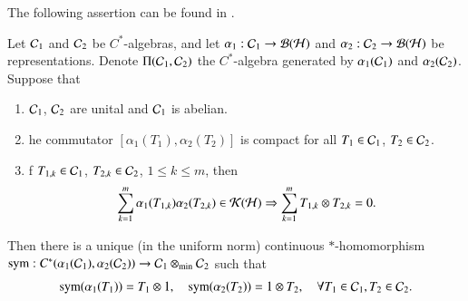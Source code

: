 \documentclass[leqno]{amsart}
\begin{document}
	The following assertion can be found in \cite[Theorem 3.3]{DAO2}.
	\begin{lemma}\label{symbol-existence}
		Let ${\mathcal C}_{1}$ and ${\mathcal C}_{2}$ be $C^{*}$-algebras, and let $\alpha_{1}:{\mathcal C}_{1}\rightarrow{\mathcal B}({\mathcal H})$ and $\alpha_{2}:{\mathcal C}_{2}\rightarrow{\mathcal B}({\mathcal H})$ be representations. Denote $\Pi({\mathcal C}_{1},{\mathcal C}_{2})$ the $C^{*}$-algebra generated by $\alpha_{1}({\mathcal C}_{1})$ and $\alpha_{2}({\mathcal C}_{2})$. Suppose that
		
		\begin{enumerate}[\rm(1)]
			\item ${\mathcal C}_{1}$, ${\mathcal C}_{2}$ are unital and ${\mathcal C}_{1}$ is abelian.
			
			\item {}he commutator $[\alpha_{1}(T_{1}),\alpha_{2}(T_{2})]$ is compact for all $T_{1}\in{\mathcal C}_{1}$, $T_{2}\in{\mathcal C}_{2}$.
			
			\item {}f $T_{1,k}\in{\mathcal C}_{1}$, $T_{2,k}\in{\mathcal C}_{2}$, $1\leq k\leq m$, then
			\begin{align*}
				\sum_{k=1}^{m}\alpha_{1}(T_{1,k})\alpha_{2}(T_{2,k})\in{\mathcal K}({\mathcal H})\Rightarrow\sum_{k=1}^{m}T_{1,k}\otimes T_{2,k}=0.
			\end{align*}
		\end{enumerate}
		Then there is a unique (in the uniform norm) continuous $*$-homomorphism ${\rm sym}:C^{\ast}(\alpha_1({\mathcal C}_{1}),\alpha_2({\mathcal C}_{2}))\rightarrow {\mathcal C}_{1}\otimes_{\rm min}{\mathcal C}_{2}$ such that
		\begin{align*}
			{\rm sym}(\alpha_{1}(T_{1}))=T_{1}\otimes1,\quad
			{\rm sym}(\alpha_{2}(T_{2}))=1\otimes T_{2},\quad\forall T_{1}\in{\mathcal C}_{1},T_{2}\in{\mathcal C}_{2}.
		\end{align*}
	\end{lemma}
	
	
	
\end{document}
